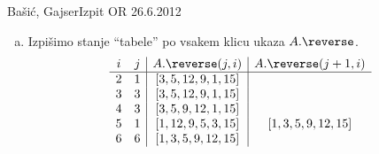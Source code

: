 \begin{naloga}{Bašić, Gajser}{Izpit OR 26.6.2012}
\begin{odgovor}
\begin{enumerate}[(a)]
\item Izpišimo stanje ``tabele'' po vsakem klicu ukaza $A.\reverse$.
$$
\begin{array}{cc|c|c}
i & j & A.\reverse(j, i) & A.\reverse(j+1, i) \\ \hline
2 & 1 & [3, 5, 12, 9, 1, 15] & \\
3 & 3 & [3, 5, 12, 9, 1, 15] & \\
4 & 3 & [3, 5, 9, 12, 1, 15] & \\
5 & 1 & [1, 12, 9, 5, 3, 15] & [1, 3, 5, 9, 12, 15] \\
6 & 6 & [1, 3, 5, 9, 12, 15] &
\end{array}
$$
\end{enumerate}
\end{odgovor}
\end{naloga}
